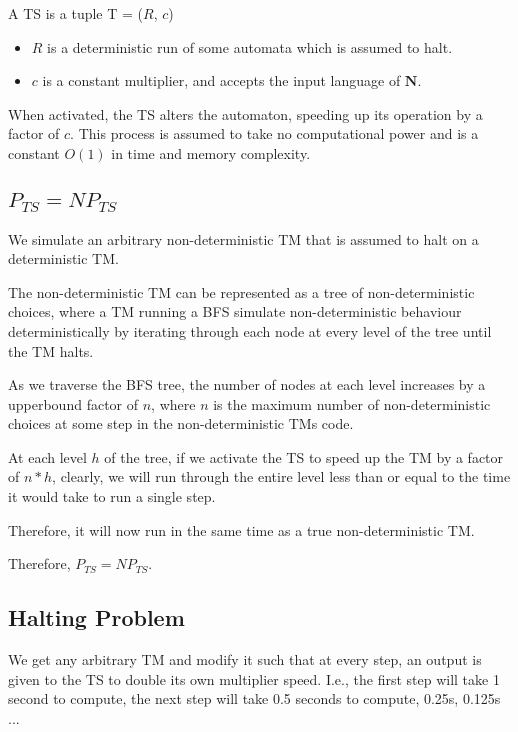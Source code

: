 \documentclass{report}
\begin{document}
A TS is a tuple T = ($R$, $c$)

\begin{itemize}
  \item $R$ is a deterministic run of some automata which is assumed to halt.
  \item $c$ is a constant multiplier, and accepts the input language of $\mathbf{N}$.
\end{itemize}

When activated, the TS alters the automaton, speeding up its operation by a factor of $c$. This process is assumed to take no computational power and is a constant $O(1)$ in time and memory complexity.

\subsection{$P_{TS} = NP_{TS}$}

We simulate an arbitrary non-deterministic TM that is assumed to halt on a deterministic TM. \cite{simulate-non-determinisim}

The non-deterministic TM can be represented as a tree of non-deterministic choices, where a TM running a BFS simulate non-deterministic behaviour deterministically by iterating through each node at every level of the tree until the TM halts.

As we traverse the BFS tree, the number of nodes at each level increases by a upperbound factor of $n$, where $n$ is the maximum number of non-deterministic choices at some step in the non-deterministic TMs code.

At each level $h$ of the tree, if we activate the TS to speed up the TM by a factor of $n*h$, clearly, we will run through the entire level less than or equal to the time it would take to run a single step.

Therefore, it will now run in the same time as a true non-deterministic TM.

Therefore, $P_{TS} = NP_{TS}$.

\subsection{Halting Problem}

We get any arbitrary TM and modify it such that at every step, an output is given to the TS to double its own multiplier speed. I.e., the first step will take 1 second to compute, the next step will take 0.5 seconds to compute, 0.25s, 0.125s ...
\end{document}
